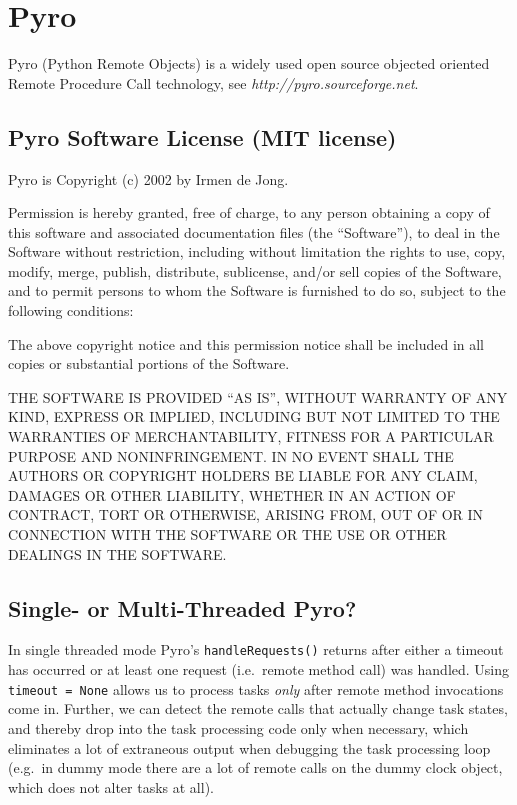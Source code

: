\documentclass[11pt,a4paper]{article}
\begin{document}
\pagebreak
\section{Pyro} 
\label{Pyro}

Pyro (Python Remote Objects) is a widely used open source objected
oriented Remote Procedure Call technology, see {\em
http://pyro.sourceforge.net}.

\subsection{Pyro Software License (MIT license)}
\label{PyroSoftwareLicense(MITlicense)}

Pyro is Copyright (c) 2002  by Irmen de Jong.

Permission is hereby granted, free of charge, to any person obtaining a
copy of this software and associated documentation files (the
``Software''), to deal in the Software without restriction, including
without limitation the rights to use, copy, modify, merge, publish,
distribute, sublicense, and/or sell copies of the Software, and to
permit persons to whom the Software is furnished to do so, subject to
the following conditions:

The above copyright notice and this permission notice shall be included
in all copies or substantial portions of the Software.

THE SOFTWARE IS PROVIDED ``AS IS'', WITHOUT WARRANTY OF ANY KIND,
EXPRESS OR IMPLIED, INCLUDING BUT NOT LIMITED TO THE WARRANTIES OF
MERCHANTABILITY, FITNESS FOR A PARTICULAR PURPOSE AND NONINFRINGEMENT.
IN NO EVENT SHALL THE AUTHORS OR COPYRIGHT HOLDERS BE LIABLE FOR ANY
CLAIM, DAMAGES OR OTHER LIABILITY, WHETHER IN AN ACTION OF CONTRACT,
TORT OR OTHERWISE, ARISING FROM, OUT OF OR IN CONNECTION WITH THE
SOFTWARE OR THE USE OR OTHER DEALINGS IN THE SOFTWARE.
                                          
\subsection{Single- or Multi-Threaded Pyro?}
\label{Single-orMulti-ThreadedPyro?}

In single threaded mode Pyro's \lstinline=handleRequests()= returns
after either a timeout has occurred or at least one request
(i.e.\ remote method call) was handled. Using \lstinline|timeout = None| 
allows us to process tasks {\em only} after remote method invocations
come in.  Further, we can detect the remote calls that actually change
task states, and thereby drop into the task processing code only when
necessary, which eliminates a lot of extraneous output when debugging
the task processing loop (e.g.\ in dummy mode there are a lot of remote
calls on the dummy clock object, which does not alter tasks at all). 
\end{document}
